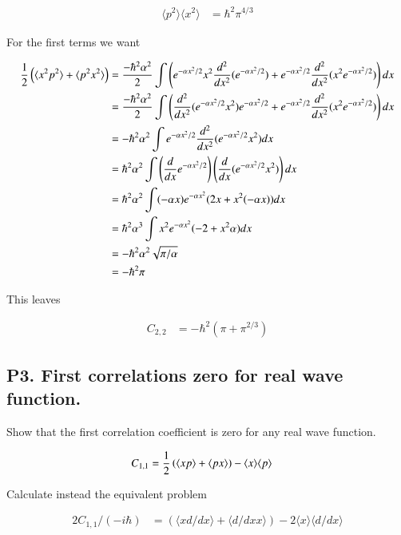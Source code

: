 \documentclass{article}
\newcommand{\expectation}[1]{\langle{#1}\rangle}
\begin{document}
\begin{align*}
\expectation{p^2} \expectation{x^2} &= \hbar^2 \pi^{4/3}
\end{align*}

For the first terms we want

\begin{align*}
\inv{2} \left( \expectation{x^2 p^2} + \expectation{p^2 x^2} \right)
&=
\frac{-\hbar^2 \alpha^2}{2} \int \left( 
e^{-\alpha x^2/2} x^2 \frac{d^2}{dx^2} (e^{-\alpha x^2/2} )
+ e^{-\alpha x^2/2} \frac{d^2}{dx^2} ( x^2 e^{-\alpha x^2/2} ) \right) dx \\
&=
\frac{-\hbar^2 \alpha^2}{2} \int \left( 
 \frac{d^2}{dx^2} ( e^{-\alpha x^2/2} x^2 ) e^{-\alpha x^2/2} 
+ e^{-\alpha x^2/2} \frac{d^2}{dx^2} ( x^2 e^{-\alpha x^2/2} ) \right) dx \\
&=
{-\hbar^2 \alpha^2} \int e^{-\alpha x^2/2} \frac{d^2}{dx^2} ( e^{-\alpha x^2/2} x^2 ) dx \\
&=
{\hbar^2 \alpha^2} \int \left( \frac{d}{dx} e^{-\alpha x^2/2} \right) \left( \frac{d}{dx} ( e^{-\alpha x^2/2} x^2 ) \right) dx \\
&=
{\hbar^2 \alpha^2} \int (-\alpha x) e^{-\alpha x^2} (2x + x^2(-\alpha x)) dx \\
&=
{\hbar^2 \alpha^3} \int x^2 e^{-\alpha x^2} (-2 + x^2 \alpha ) dx \\
&=
{-\hbar^2 \alpha^2} \sqrt{\pi/\alpha}  \\
&=
-\hbar^2 \pi
\end{align*}

This leaves 

\begin{align*}
C_{2,2} &=
-\hbar^2 \left( \pi + \pi^{2/3} \right)
\end{align*}

\subsection{ P3. First correlations zero for real wave function. }

Show that the first correlation coefficient is zero for any real wave function.

\begin{align*}
C_{1,1} &= \inv{2}\left( \expectation{x p} + \expectation{p x} \right) - \expectation{x}\expectation{p}
\end{align*}

Calculate instead the equivalent problem

\begin{align*}
2 C_{1,1}/(-i\hbar) &= \left( \expectation{x d/dx} + \expectation{d/dx x} \right) - 2 \expectation{x}\expectation{d/dx}
\end{align*}
\end{document}

